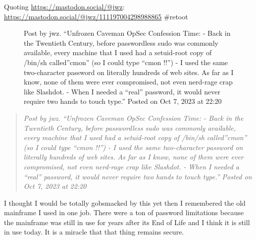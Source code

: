 Quoting \href{@jwz@mastodon.social}{https://mastodon.social/@jwz}:
\url{https://mastodon.social/@jwz/111197004298988865} \#retoot

\begin{figure}
\centering
{}
\caption{Post by jwz. ``Unfrozen Caveman OpSec Confession Time: - Back
in the Twentieth Century, before passwordless sudo was commonly
available, every machine that I used had a setuid-root copy of /bin/sh
called''cmon'' (so I could type ``cmon !!'') - I used the same
two-character password on literally hundreds of web sites. As far as I
know, none of them were ever compromised, not even nerd-rage crap like
Slashdot. - When I needed a ``real'' password, it would never require
two hands to touch type.'' Posted on Oct 7, 2023 at 22:20}
\end{figure}

\begin{quote}
\emph{Post by jwz. ``Unfrozen Caveman OpSec Confession Time: - Back in
the Twentieth Century, before passwordless sudo was commonly available,
every machine that I used had a setuid-root copy of /bin/sh
called''cmon'' (so I could type ``cmon !!'') - I used the same
two-character password on literally hundreds of web sites. As far as I
know, none of them were ever compromised, not even nerd-rage crap like
Slashdot. - When I needed a ``real'' password, it would never require
two hands to touch type.'' Posted on Oct 7, 2023 at 22:20}
\end{quote}

I thought I would be totally gobsmacked by this yet then I remembered
the old mainframe I used in one job. There were a ton of password
limitations because the mainframe was still in use for years after its
End of Life and I think it is still in use today. It is a miracle that
that thing remains secure.
